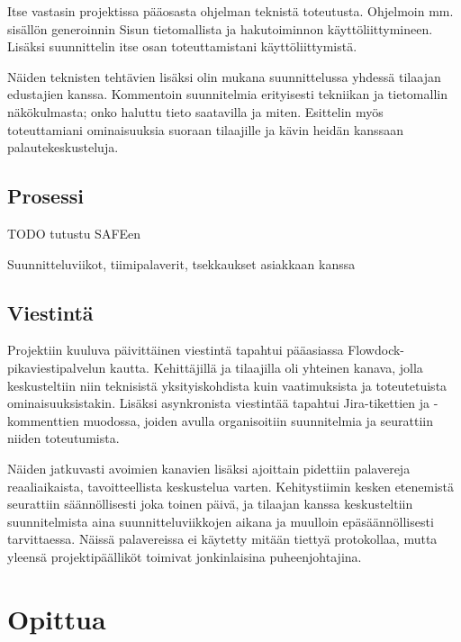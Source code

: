 \documentclass{article}
\begin{document}
Itse vastasin projektissa pääosasta ohjelman teknistä toteutusta. Ohjelmoin mm.
sisällön generoinnin Sisun tietomallista ja hakutoiminnon käyttöliittymineen.
Lisäksi suunnittelin itse osan toteuttamistani käyttöliittymistä.

Näiden teknisten tehtävien lisäksi olin mukana suunnittelussa yhdessä tilaajan
edustajien kanssa. Kommentoin suunnitelmia erityisesti tekniikan ja tietomallin
näkökulmasta; onko haluttu tieto saa\-ta\-vil\-la ja mi\-ten. Esittelin myös
toteuttamiani ominaisuuksia suoraan tilaajille ja kävin heidän kans\-saan
palaute\-kes\-kus\-teluja.

\subsection{Prosessi}

TODO tutustu SAFEen

Suunnitteluviikot, tiimipalaverit, tsekkaukset asiakkaan kanssa

\subsection{Viestintä}

Projektiin kuuluva päivittäinen viestintä tapahtui pääasiassa
Flowdock-pikaviestipalvelun kautta. Kehittäjillä ja tilaajilla oli yhteinen
kanava, jolla keskusteltiin niin teknisistä yksityiskohdista kuin vaatimuksista
ja toteutetuista ominaisuuksistakin. Lisäksi asynkronista viestintää tapahtui
Jira-tikettien ja -kommenttien muodossa, joiden avulla organisoitiin
suunnitelmia ja seurattiin niiden toteutumista.

Näiden jatkuvasti avoimien kanavien lisäksi ajoittain pidettiin palavereja
reaaliaikaista, tavoitteellista keskustelua varten. Kehitystiimin kesken
etenemistä seurattiin säännöllisesti joka toinen päivä, ja tilaajan kanssa
keskusteltiin suunnitelmista aina suunnitteluviikkojen aikana ja muulloin
epäsäännöllisesti tarvittaessa. Näissä palavereissa ei käytetty mitään tiettyä
protokollaa, mutta yleensä projektipäälliköt toimivat jonkinlaisina
puheenjohtajina.

\section{Opittua}
\end{document}
